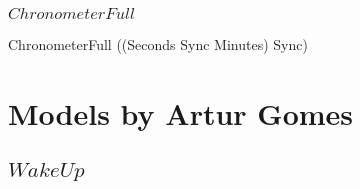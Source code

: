 \subsubsection{$ChronometerFull$}

\begin{circus}
  \circprocess ChronometerFull \circdef ((Seconds \lpar Sync \rpar Minutes) \circhide Sync)
\end{circus}
%
\section{Models by Artur Gomes}

\subsection{$WakeUp$}

